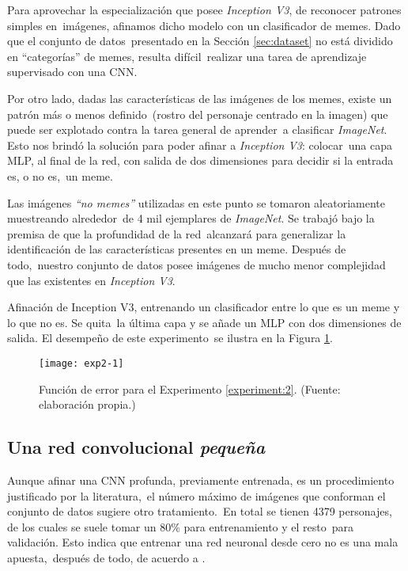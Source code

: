 \noindent
Para aprovechar la especialización que posee \emph{Inception V3}, de reconocer patrones simples en\
imágenes, afinamos dicho modelo con un clasificador de memes. Dado que el conjunto de datos\
presentado en la Sección \ref{sec:dataset} no está dividido en ``categorías'' de memes, resulta difícil\
realizar una tarea de aprendizaje supervisado con una CNN.\par
Por otro lado, dadas las características de las imágenes de los memes, existe un patrón más o menos definido\
(rostro del personaje centrado en la imagen) que puede ser explotado contra la tarea general de aprender\
a clasificar \emph{ImageNet}. Esto nos brindó la solución para poder afinar a \emph{Inception V3}: colocar\
una capa MLP, al final de la red, con salida de dos dimensiones para decidir si la entrada es, o no es,\
un meme.\par
Las imágenes \emph{``no memes''} utilizadas en este punto se tomaron aleatoriamente muestreando alrededor\
de 4 mil ejemplares de \emph{ImageNet}. Se trabajó bajo la premisa de que la profundidad de la red\
alcanzará para generalizar la identificación de las características presentes en un meme. Después de todo,\
nuestro conjunto de datos posee imágenes de mucho menor complejidad que las existentes en \emph{Inception V3}.

\begin{experiment} \label{experiment:2}
  Afinación de Inception V3, entrenando un clasificador entre lo que es un meme y lo que no es. Se quita\
  la última capa y se añade un MLP con dos dimensiones de salida. El desempeño de este experimento\
  se ilustra en la Figura \ref{exp2}.
\end{experiment}

\begin{figure}[H]
  \texttt{[image: exp2-1]}
  \caption{
    Función de error para el Experimento \ref{experiment:2}.
    (Fuente: elaboración propia.)
  }
  \label{exp2}
\end{figure}

\subsection{Una red convolucional \emph{pequeña}}

\noindent
Aunque afinar una CNN profunda, previamente entrenada, es un procedimiento justificado por la literatura,\
el número máximo de imágenes que conforman el conjunto de datos sugiere otro tratamiento.\
En total se tienen 4379 personajes, de los cuales se suele tomar un $80\%$ para entrenamiento y el resto\
para validación. Esto indica que entrenar una red neuronal desde cero no es una mala apuesta,\
después de todo, de acuerdo a \cite{DBLP:journals/corr/YosinskiCBL14}.

